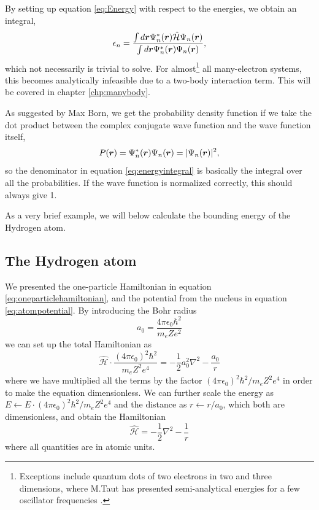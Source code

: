 By setting up equation \eqref{eq:Energy} with respect to the energies, we obtain an integral,
\begin{equation}
\epsilon_n=\frac{\int d\boldsymbol{{r}}\Psi_n^*(\boldsymbol{{r}})\hat{\mathcal{H}}\Psi_n(\boldsymbol{{r}})}{\int d\boldsymbol{{r}}\Psi_n^*(\boldsymbol{{r}})\Psi_n(\boldsymbol{{r}})},
\label{eq:energyintegral}
\end{equation}
which not necessarily is trivial to solve. For almost\footnote{Exceptions include quantum dots of two electrons in two and three dimensions, where M.Taut has presented semi-analytical energies for a few oscillator frequencies \cite{taut_two_1993,taut_two_1994}.} all many-electron systems, this becomes analytically infeasible due to a two-body interaction term. This will be covered in chapter \ref{chp:manybody}.

As suggested by Max Born, we get the probability density function if we take the dot product between the complex conjugate wave function and the wave function itself,
\begin{equation}
P(\boldsymbol{{r}})=\Psi_n^*(\boldsymbol{{r}})\Psi_n(\boldsymbol{{r}})=|\Psi_n(\boldsymbol{{r}})|^2,
\label{eq:pdf}
\end{equation}
so the denominator in equation \eqref{eq:energyintegral} is basically the integral over all the probabilities. If the wave function is normalized correctly, this should always give 1. 

As a very brief example, we will below calculate the bounding energy of the Hydrogen atom.

\subsection{The Hydrogen atom} \label{sec:hydrogen}
We presented the one-particle Hamiltonian in equation \eqref{eq:oneparticlehamiltonian}, and the potential from the nucleus in equation \eqref{eq:atompotential}. By introducing the Bohr radius
\begin{equation}
a_0=\frac{4\pi\epsilon_0\hbar^2}{m_eZe^2}
\end{equation}
we can set up the total Hamiltonian as
\begin{equation}
\hat{\mathcal{H}}\cdot\frac{(4\pi\epsilon_0)^2\hbar^2}{m_eZ^2e^4}=-\frac{1}{2}a_0^2\nabla^2-\frac{a_0}{r}
\end{equation}
where we have multiplied all the terms by the factor $(4\pi\epsilon_0)^2\hbar^2/m_eZ^2e^4$ in order to make the equation dimensionless. We can further scale the energy as $E\leftarrow E\cdot (4\pi\epsilon_0)^2\hbar^2/m_eZ^2e^4$ and the distance as $r\leftarrow r/a_0$, which both are dimensionless, and obtain the Hamiltonian
\begin{equation}
\hat{\mathcal{H}}=-\frac{1}{2}\nabla^2-\frac{1}{r}
\end{equation}
where all quantities are in atomic units.

